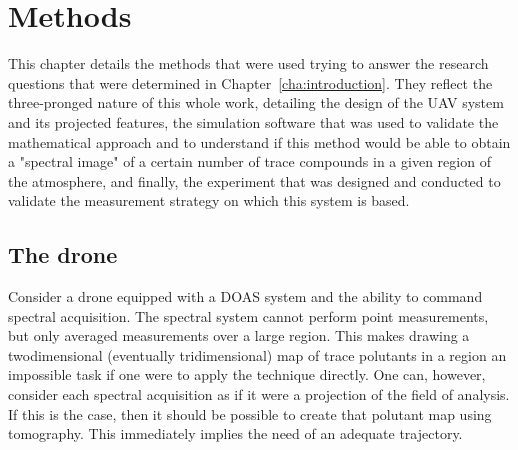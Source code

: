 \chapter{Methods}
\label{cha:methods}


This chapter details the methods that were used trying to answer the
research questions that were determined in
Chapter~\ref{cha:introduction}. They reflect the three-pronged nature
of this whole work, detailing the design of the UAV system and its
projected features, the simulation software that was used to validate
the mathematical approach and to understand if this method would be able
to obtain a "spectral image" of a certain number of trace compounds in
a given region of the atmosphere, and finally, the experiment that was
designed and conducted to validate the measurement strategy on which
this system is based.

\section{The drone}%
\label{sec:the_drone}

Consider a drone equipped with a DOAS system and the ability to command
spectral acquisition. The spectral system cannot perform point
measurements, but only averaged measurements over a large region. This
makes drawing a twodimensional (eventually tridimensional) map of trace
polutants in a region an impossible task if one were to apply the
technique directly. One can, however, consider each spectral acquisition
as if it were a projection of the field of analysis. If this is the
case, then it should be possible to create that polutant map using
tomography. This immediately implies the need of an adequate trajectory.

